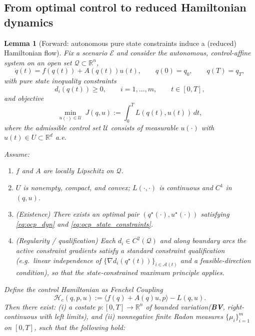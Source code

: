 \documentclass{article} %
\newtheorem{lemma}[theorem]{Lemma}         %
\begin{document}
\subsection{From optimal control to reduced Hamiltonian dynamics }
\label{app:ocp_to_ham}
\begin{lemma}[Forward: autonomous pure state constraints induce a (reduced) Hamiltonian flow]
\label{thm:forward_state_constrained_pmp_reduced_ham}
Fix a scenario $\mathcal{E}$ and consider the autonomous, control-affine system on an open set
$\mathcal{Q}\subset\mathbb{R}^n$,
\begin{equation}
\dot q(t)=f(q(t)) + A(q(t))u(t),\qquad q(0)=q_0,\qquad q(T)=q_T,
\label{eq:ocp_dyn}
\end{equation}
with pure state inequality constraints
\begin{equation}
d_i(q(t))\ge 0,\qquad i=1,\dots,m,\qquad t\in[0,T],
\label{eq:ocp_state_constraints}
\end{equation}
and objective
\begin{equation}
\min_{u(\cdot)\in\mathcal{U}} \ J(q, u)
:=\int_0^T L(q(t),u(t))\,dt,
\label{eq:ocp_cost}
\end{equation}
where the admissible control set $\mathcal{U}$ consists of measurable $u(\cdot)$ with
$u(t)\in U\subset\mathbb{R}^d$ a.e.

Assume:
\begin{enumerate}
\item $f$ and $A$ are locally Lipschitz on $\mathcal{Q}$.
\item $U$ is nonempty, compact, and convex; $L(\cdot,\cdot)$ is continuous and $C^1$ in $(q,u)$.
\item (Existence) There exists an optimal pair $(q^\star(\cdot),u^\star(\cdot))$ satisfying
\cref{eq:ocp_dyn} and \cref{eq:ocp_state_constraints}.
\item (Regularity / qualification) Each $d_i\in C^2(\mathcal{Q})$ and along boundary arcs the active constraint
gradients satisfy a standard constraint qualification (e.g.\ linear independence of
$\{\nabla d_i(q^\star(t))\}_{i\in\mathcal{A}(t)}$ and a feasible-direction condition), so that the
state-constrained maximum principle applies.
\end{enumerate}

Define the \emph{control Hamiltonian} as \textit{Fenchel Coupling}
\begin{equation}
\mathcal{H}_c(q,p,u):=\langle f(q)+A(q)u, p\rangle-L(q,u).
\label{eq:def_control_ham}
\end{equation}
Then there exist:
(i) a costate $p:[0,T]\to\mathbb{R}^n$ of bounded variation(\textbf{BV}, right-continuous with left limits),
and (ii) nonnegative finite Radon measures $\{\mu_i\}_{i=1}^m$ on $[0,T]$,
such that the following hold:


\end{lemma}
\end{document}
